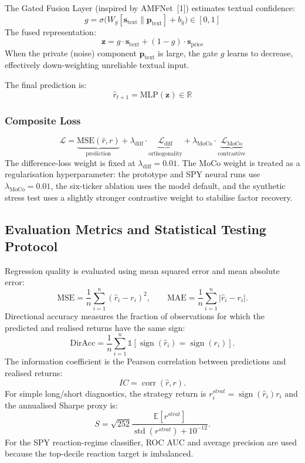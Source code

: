 \documentclass[12pt, a4paper]{article}
\begin{document}
The Gated Fusion Layer (inspired by AMFNet~[1]) estimates textual confidence:
\[
    g = \sigma\big(W_g [\mathbf{s}_\text{text} \| \mathbf{p}_\text{text}] + b_g\big) \in [0, 1]
\]
The fused representation:
\[
    \mathbf{z} = g \cdot \mathbf{s}_\text{text} + (1 - g) \cdot \mathbf{s}_\text{price}
\]
When the private (noise) component $\mathbf{p}_\text{text}$ is large, the gate $g$ learns to decrease, effectively down-weighting unreliable textual input.

The final prediction is:
\[
    \hat{r}_{t+1} = \text{MLP}(\mathbf{z}) \in \mathbb{R}
\]


\subsubsection{Composite Loss}

\[
    \mathcal{L} = \underbrace{\text{MSE}(\hat{r}, r)}_{\text{prediction}} + \lambda_\text{diff} \cdot \underbrace{\mathcal{L}_\text{diff}}_{\text{orthogonality}} + \lambda_\text{MoCo} \cdot \underbrace{\mathcal{L}_\text{MoCo}}_{\text{contrastive}}
\]
The difference-loss weight is fixed at $\lambda_\text{diff} = 0.01$. The MoCo weight is treated as a regularisation hyperparameter: the prototype and SPY neural runs use $\lambda_\text{MoCo} = 0.01$, the six-ticker ablation uses the model default, and the synthetic stress test uses a slightly stronger contrastive weight to stabilise factor recovery.

\subsection{Evaluation Metrics and Statistical Testing Protocol}

Regression quality is evaluated using mean squared error and mean absolute error:
\[
    \text{MSE}=\frac{1}{n}\sum_{i=1}^{n}(\hat r_i-r_i)^2, \qquad
    \text{MAE}=\frac{1}{n}\sum_{i=1}^{n}|\hat r_i-r_i|.
\]
Directional accuracy measures the fraction of observations for which the predicted and realised returns have the same sign:
\[
    \text{DirAcc}=\frac{1}{n}\sum_{i=1}^{n}\mathbb{1}[\operatorname{sign}(\hat r_i)=\operatorname{sign}(r_i)].
\]
The information coefficient is the Pearson correlation between predictions and realised returns:
\[
    IC=\operatorname{corr}(\hat r, r).
\]
For simple long/short diagnostics, the strategy return is $r_i^{strat}=\operatorname{sign}(\hat r_i)r_i$ and the annualised Sharpe proxy is:
\[
    S=\sqrt{252}\frac{\mathbb{E}[r^{strat}]}{\operatorname{std}(r^{strat})+10^{-12}}.
\]
For the SPY reaction-regime classifier, ROC AUC and average precision are used because the top-decile reaction target is imbalanced.
\end{document}
